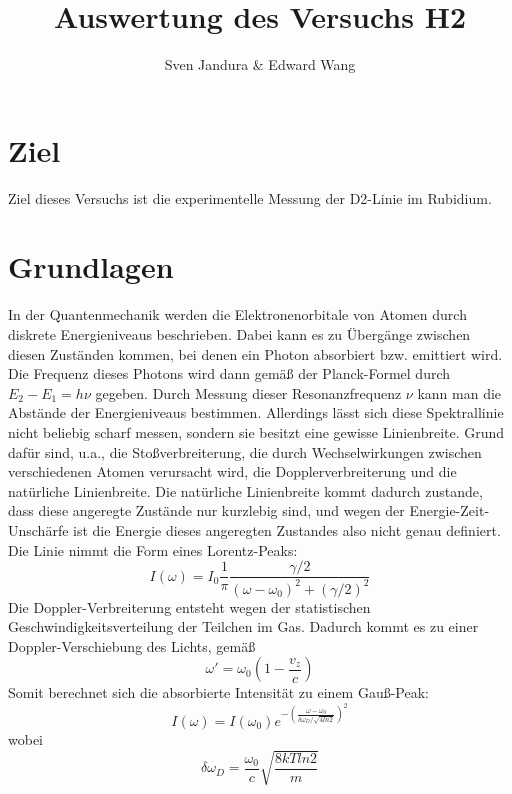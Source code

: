 \documentclass[a4paper,parskip]{scrartcl}
\author{Sven Jandura \& Edward Wang}
\title{Auswertung des Versuchs H2}
\begin{document}
\maketitle

\tableofcontents

\section{Ziel}

Ziel dieses Versuchs ist die experimentelle Messung der D2-Linie im Rubidium.

\section{Grundlagen}

In der Quantenmechanik werden die Elektronenorbitale von Atomen durch diskrete Energieniveaus beschrieben. Dabei kann es zu Übergänge zwischen diesen Zuständen kommen, bei denen ein Photon absorbiert bzw. emittiert wird. Die Frequenz dieses Photons wird dann gemäß der Planck-Formel durch $E_2 - E_1 = h \nu$ gegeben. Durch Messung dieser Resonanzfrequenz $\nu$ kann man die Abstände der Energieniveaus bestimmen. Allerdings lässt sich diese Spektrallinie nicht beliebig scharf messen, sondern sie besitzt eine gewisse Linienbreite. Grund dafür sind, u.a., die Stoßverbreiterung, die durch Wechselwirkungen zwischen verschiedenen Atomen verursacht wird, die Dopplerverbreiterung und die natürliche Linienbreite. Die natürliche Linienbreite kommt dadurch zustande, dass diese angeregte Zustände nur kurzlebig sind, und wegen der Energie-Zeit-Unschärfe ist die Energie dieses angeregten Zustandes also nicht genau definiert. Die Linie nimmt die Form eines Lorentz-Peaks:
\begin{equation}
    I(\omega) = I_0 \frac{1}{\pi} \frac{\gamma/2}{(\omega - \omega_0)^2 + (\gamma / 2)^2}
\end{equation}
Die Doppler-Verbreiterung entsteht wegen der statistischen Geschwindigkeitsverteilung der Teilchen im Gas. Dadurch kommt es zu einer Doppler-Verschiebung des Lichts, gemäß
\begin{equation}
    \omega' = \omega_0 \left(1 - \frac{v_z}{c} \right)
\end{equation}
Somit berechnet sich die absorbierte Intensität zu einem Gauß-Peak:
\begin{equation}
    I(\omega) = I(\omega_0) e^{- \left( \frac{\omega - \omega_0}{\delta \omega_D/\sqrt{4 ln 2}} \right)^2}
\end{equation}
wobei
\begin{equation}
    \delta \omega_D = \frac{\omega_0}{c} \sqrt{\frac{8 kT ln2}{m}}
\end{equation}
\end{document}

